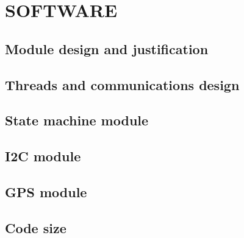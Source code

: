 \section{SOFTWARE}
\subsection{Module design and justification}

\subsection{Threads and communications design}

\subsection{State machine module}

\subsection{I2C module}

\subsection{GPS module}

\subsection{Code size}